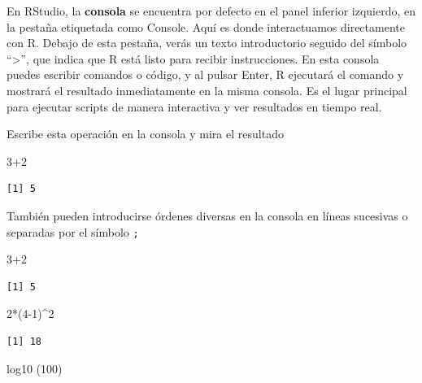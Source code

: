 \documentclass[
  letterpaper,
  DIV=11,
  numbers=noendperiod]{scrreprt}
\newenvironment{Shaded}{\begin{snugshade}}{\end{snugshade}}
\newcommand{\DecValTok}[1]{\textcolor[rgb]{0.68,0.00,0.00}{#1}}
\newcommand{\FunctionTok}[1]{\textcolor[rgb]{0.28,0.35,0.67}{#1}}
\newcommand{\NormalTok}[1]{\textcolor[rgb]{0.00,0.23,0.31}{#1}}
\newcommand{\SpecialCharTok}[1]{\textcolor[rgb]{0.37,0.37,0.37}{#1}}
\begin{document}
En RStudio, la \textbf{consola} se encuentra por defecto en el panel
inferior izquierdo, en la pestaña etiquetada como Console. Aquí es donde
interactuamos directamente con R. Debajo de esta pestaña, verás un texto
introductorio seguido del símbolo ``\textgreater{}'', que indica que R
está listo para recibir instrucciones. En esta consola puedes escribir
comandos o código, y al pulsar Enter, R ejecutará el comando y mostrará
el resultado inmediatamente en la misma consola. Es el lugar principal
para ejecutar scripts de manera interactiva y ver resultados en tiempo
real.

Escribe esta operación en la consola y mira el resultado

\begin{Shaded}
\begin{Highlighting}[]
\DecValTok{3}\SpecialCharTok{+}\DecValTok{2}
\end{Highlighting}
\end{Shaded}

\begin{verbatim}
[1] 5
\end{verbatim}

También pueden introducirse órdenes diversas en la consola en líneas
sucesivas o separadas por el símbolo \texttt{;}

\begin{Shaded}
\begin{Highlighting}[]
\DecValTok{3}\SpecialCharTok{+}\DecValTok{2} 
\end{Highlighting}
\end{Shaded}

\begin{verbatim}
[1] 5
\end{verbatim}

\begin{Shaded}
\begin{Highlighting}[]
\DecValTok{2}\SpecialCharTok{*}\NormalTok{(}\DecValTok{4{-}1}\NormalTok{)}\SpecialCharTok{\^{}}\DecValTok{2} 
\end{Highlighting}
\end{Shaded}

\begin{verbatim}
[1] 18
\end{verbatim}

\begin{Shaded}
\begin{Highlighting}[]
\FunctionTok{log10}\NormalTok{ (}\DecValTok{100}\NormalTok{) }
\end{Highlighting}
\end{Shaded}
\end{document}
